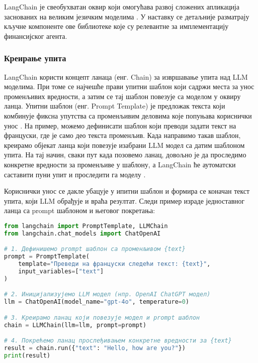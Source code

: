 LangChain је свеобухватан оквир који омогућава развој сложених апликација заснованих на великим језичким моделима \cite{langchain_docs_2024}. У наставку се детаљније разматрају кључне компоненте ове библиотеке које су релевантне за имплементацију финансијског агента.

\subsubsection{Креирање упита}

LangChain користи концепт ланаца (енг. Chain) за извршавање упита над LLM моделима. При томе се најчешће прави упитни шаблон који садржи места за унос променљивих вредности, а затим се тај шаблон повезује са моделом у оквиру ланца. Упитни шаблон (енг. Prompt Template) је предложак текста који комбинује фиксна упутства са променљивим деловима које попуњава кориснички унос \cite{langchain_docs_2024}. На пример, можемо дефинисати шаблон који преводи задати текст на француски, где је само део текста променљив. Када направимо такав шаблон, креирамо објекат ланца који повезује изабрани LLM модел са датим шаблоном упита. На тај начин, сваки пут када позовемо ланац, довољно је да проследимо конкретне вредности за променљиве у шаблону, а LangChain ће аутоматски саставити пуни упит и проследити га моделу \cite{langchain_docs_2024}.

Кориснички унос се дакле убацује у ипитни шаблон и формира се коначан текст упита, који LLM обрађује и враћа резултат. Следи пример израде једноставног ланца са prompt шаблоном и његовог покретања:

\begin{lstlisting}[language=Python, caption={Пример креирања ланца са prompt шаблоном}, label={lst:langchain_prompt_template}]
from langchain import PromptTemplate, LLMChain
from langchain.chat_models import ChatOpenAI

# 1. Дефинишемо prompt шаблон са променљивом {text}
prompt = PromptTemplate(
    template="Преведи на француски следећи текст: {text}",
    input_variables=["text"]
)

# 2. Иницијализујемо LLM модел (нпр. OpenAI ChatGPT модел)
llm = ChatOpenAI(model_name="gpt-4o", temperature=0)

# 3. Креирамо ланац који повезује модел и prompt шаблон
chain = LLMChain(llm=llm, prompt=prompt)

# 4. Покрећемо ланац прослеђивањем конкретне вредности за {text}
result = chain.run({"text": "Hello, how are you?"})
print(result)
\end{lstlisting}


